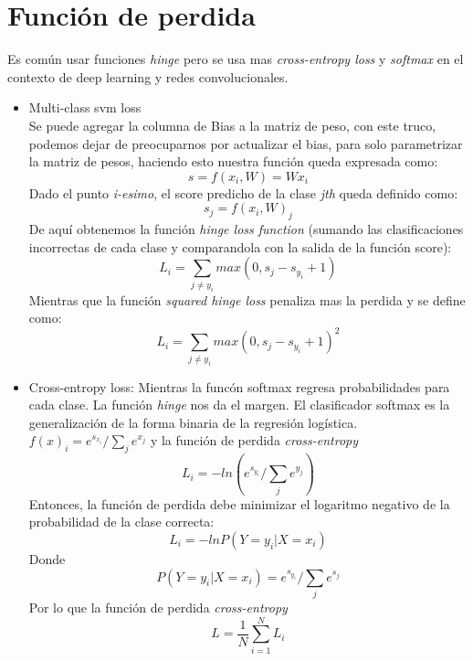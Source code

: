\documentclass{article}
\begin{document}
\section{Función de perdida}
  Es común usar funciones \textit{hinge} pero se usa mas 
  \textit{cross-entropy loss} y \textit{softmax} en el contexto de
  deep learning y redes convolucionales.
  \begin{itemize}
      \item Multi-class svm loss \\
       Se puede agregar la columna de Bias a la matriz de peso, con este truco, podemos
       dejar de preocuparnos por actualizar el bias, para solo parametrizar la matriz
       de pesos, haciendo esto nuestra función queda expresada como:
       \[
       s = f(x_i, W) = Wx_i
       \]
       Dado el punto \textit{i-esimo}, el score predicho de la clase \textit{jth} queda definido como:
       \[
       s_j = f(x_i, W)_j
       \]
       De aquí obtenemos la función \textit{hinge loss function}
       (sumando las clasificaciones incorrectas de cada clase y
       comparandola con la salida de la función score):
       \[
         L_i = \sum_{j \neq y_i} max(0, s_j - s_{y_i}+1)
       \]
       Mientras que la función \textit{squared hinge loss} penaliza
       mas la perdida y se define como:
       \[
         L_i = \sum_{j \neq y_i} max(0, s_j - s_{y_i}+1)^2
        \]
    \item Cross-entropy loss: Mientras la funcón softmax  regresa probabilidades 
    para cada clase. La función  \textit{hinge} nos da el margen. El
    clasificador softmax es la generalización de la forma binaria de la regresión
    logística. $f(x)_i = e^{s_{x_i}}/\sum_{j}e^{x_j}$ y la función de perdida \textit{cross-entropy}
    \[
    L_i = -ln(e^{s_{y_i}}/\sum_{j}e^{y_j})
    \]
    Entonces, la función de perdida debe minimizar el logaritmo negativo de la
    probabilidad de la clase correcta: 
    \[
    L_i = -lnP(Y=y_i|X=x_i) 
    \]
    Donde 
    \[
    P(Y=y_i|X=x_i) = e^{s_{y_i}}/\sum_j e^{s_j}
    \]
    Por lo que la función de perdida \textit{cross-entropy}
    \[
    L = \frac{1}{N} \sum_{i=1}^N L_i
    \]
\end{itemize}
\end{document}
